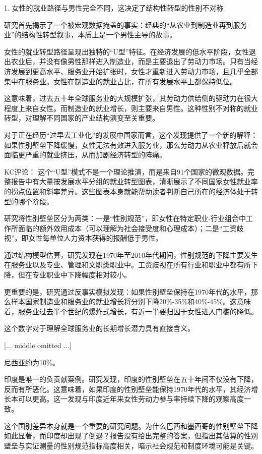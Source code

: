 \documentclass[11pt]{ctexart}
\begin{document}
1. 女性的就业路径与男性完全不同，这决定了结构性转型的性别不对称

研究首先揭示了一个被宏观数据掩盖的事实：经典的“从农业到制造业再到服务业”的结构性转型叙事，本质上是一个男性主导的故事。

女性的就业转型路径呈现出独特的“U型”特征。在经济发展的低水平阶段，女性退出农业后，并没有像男性那样进入制造业，而是主要退出了劳动力市场。只有当经济发展到更高水平、服务业开始扩张时，女性才重新进入劳动力市场，且几乎全部集中在服务业。女性在制造业的就业占比，在所有发展水平上都保持低位。

这意味着，过去五十年全球服务业的大规模扩张，其劳动力供给侧的驱动力在很大程度上来自女性。而制造业的就业增长，则主要来自男性。这种性别不对称的就业转型，对理解不同国家的产业结构演变至关重要。

对于正在经历“过早去工业化”的发展中国家而言，这个发现提供了一个新的解释：如果性别壁垒下降缓慢，女性无法有效进入服务业，那么劳动力从农业释放后就会面临更严重的就业挤压，从而加剧经济转型的阵痛。

KC评论： 这个“U型”模式不是一个理论推演，而是来自91个国家的微观数据。完整报告中有大量按发展水平分组的就业转型图表，清晰展示了不同国家女性就业率的拐点位置和斜率差异。这些图表本身就能帮助读者判断自己所在的经济体处于转型的哪个阶段。

研究将性别壁垒区分为两类：一是“性别规范”，即女性在特定职业-行业组合中工作所面临的额外效用成本（可以理解为社会接受度和心理成本）；二是“工资歧视”，即女性每单位人力资本获得的报酬低于男性。

通过结构模型估算，研究发现在1970年至2010年代期间，性别规范的下降主要发生在服务业以及专业、管理和文职类职业中。工资歧视在所有行业和职业中都有所下降，但在专业职业中下降幅度相对较小。

更重要的是，研究通过反事实模拟发现：如果性别壁垒保持在1970年代的水平，那么样本国家制造业和服务业的就业增长将分别下降20\%-35\%和40\%-45\%。这意味着，服务业过去半个世纪的爆炸式增长，有近一半要归因于女性进入门槛的降低。

这个数字对于理解全球服务业的长期增长潜力具有直接含义。

[... middle omitted ...]

尼西亚约为10\%。

印度是唯一的负贡献案例。研究发现，印度的性别壁垒在五十年间不仅没有下降，反而有所恶化。这意味着，如果印度的性别壁垒能保持1970年代的水平，其经济增长本可以更高。这一发现与印度近年来女性劳动力参与率持续下降的观察高度一致。

这个国别差异本身就是一个重要的研究问题。为什么巴西和墨西哥的性别壁垒下降如此显著，而印度却出现了倒退？报告没有给出完整的答案，但指出其估算的性别壁垒与实证测量的性别规范指标高度相关，暗示社会规范和制度环境可能是关键。
\end{document}
